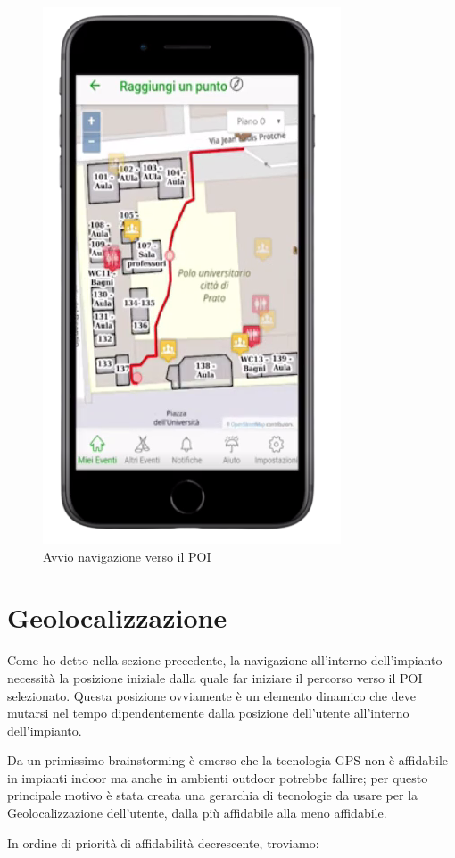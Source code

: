 \begin{figure}[h!]
    \caption{Avvio navigazione verso il POI}
    \includegraphics[scale=0.2]{img/cap2/maps-2}
\end{figure}

\section{Geolocalizzazione}
Come ho detto nella sezione precedente, la navigazione all'interno dell'impianto necessità la posizione iniziale
dalla quale far iniziare il percorso verso il POI selezionato.
Questa posizione ovviamente è un elemento dinamico che deve mutarsi nel tempo dipendentemente dalla posizione
dell'utente all'interno dell'impianto.

Da un primissimo brainstorming è emerso che la tecnologia GPS non è affidabile in impianti indoor ma anche in ambienti
outdoor potrebbe fallire; per questo principale motivo è stata creata una gerarchia di tecnologie da usare per
la Geolocalizzazione dell'utente, dalla più affidabile alla meno affidabile.

In ordine di priorità di affidabilità decrescente, troviamo:

